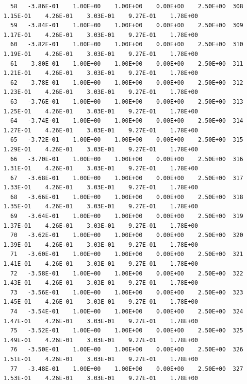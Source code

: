 \documentclass[10pt,letterpaper,notitlepage]{article}
\numberwithin{equation}{section}
\begin{document}
\begin{appendices}
{\begin{verbatim}
  58   -3.86E-01    1.00E+00    1.00E+00    0.00E+00    2.50E+00  308    1.15E-01    4.26E-01    3.03E-01    9.27E-01    1.78E+00
  59   -3.84E-01    1.00E+00    1.00E+00    0.00E+00    2.50E+00  309    1.17E-01    4.26E-01    3.03E-01    9.27E-01    1.78E+00
  60   -3.82E-01    1.00E+00    1.00E+00    0.00E+00    2.50E+00  310    1.19E-01    4.26E-01    3.03E-01    9.27E-01    1.78E+00
  61   -3.80E-01    1.00E+00    1.00E+00    0.00E+00    2.50E+00  311    1.21E-01    4.26E-01    3.03E-01    9.27E-01    1.78E+00
  62   -3.78E-01    1.00E+00    1.00E+00    0.00E+00    2.50E+00  312    1.23E-01    4.26E-01    3.03E-01    9.27E-01    1.78E+00
  63   -3.76E-01    1.00E+00    1.00E+00    0.00E+00    2.50E+00  313    1.25E-01    4.26E-01    3.03E-01    9.27E-01    1.78E+00
  64   -3.74E-01    1.00E+00    1.00E+00    0.00E+00    2.50E+00  314    1.27E-01    4.26E-01    3.03E-01    9.27E-01    1.78E+00
  65   -3.72E-01    1.00E+00    1.00E+00    0.00E+00    2.50E+00  315    1.29E-01    4.26E-01    3.03E-01    9.27E-01    1.78E+00
  66   -3.70E-01    1.00E+00    1.00E+00    0.00E+00    2.50E+00  316    1.31E-01    4.26E-01    3.03E-01    9.27E-01    1.78E+00
  67   -3.68E-01    1.00E+00    1.00E+00    0.00E+00    2.50E+00  317    1.33E-01    4.26E-01    3.03E-01    9.27E-01    1.78E+00
  68   -3.66E-01    1.00E+00    1.00E+00    0.00E+00    2.50E+00  318    1.35E-01    4.26E-01    3.03E-01    9.27E-01    1.78E+00
  69   -3.64E-01    1.00E+00    1.00E+00    0.00E+00    2.50E+00  319    1.37E-01    4.26E-01    3.03E-01    9.27E-01    1.78E+00
  70   -3.62E-01    1.00E+00    1.00E+00    0.00E+00    2.50E+00  320    1.39E-01    4.26E-01    3.03E-01    9.27E-01    1.78E+00
  71   -3.60E-01    1.00E+00    1.00E+00    0.00E+00    2.50E+00  321    1.41E-01    4.26E-01    3.03E-01    9.27E-01    1.78E+00
  72   -3.58E-01    1.00E+00    1.00E+00    0.00E+00    2.50E+00  322    1.43E-01    4.26E-01    3.03E-01    9.27E-01    1.78E+00
  73   -3.56E-01    1.00E+00    1.00E+00    0.00E+00    2.50E+00  323    1.45E-01    4.26E-01    3.03E-01    9.27E-01    1.78E+00
  74   -3.54E-01    1.00E+00    1.00E+00    0.00E+00    2.50E+00  324    1.47E-01    4.26E-01    3.03E-01    9.27E-01    1.78E+00
  75   -3.52E-01    1.00E+00    1.00E+00    0.00E+00    2.50E+00  325    1.49E-01    4.26E-01    3.03E-01    9.27E-01    1.78E+00
  76   -3.50E-01    1.00E+00    1.00E+00    0.00E+00    2.50E+00  326    1.51E-01    4.26E-01    3.03E-01    9.27E-01    1.78E+00
  77   -3.48E-01    1.00E+00    1.00E+00    0.00E+00    2.50E+00  327    1.53E-01    4.26E-01    3.03E-01    9.27E-01    1.78E+00

\end{verbatim}}
\end{appendices}
\end{document}
